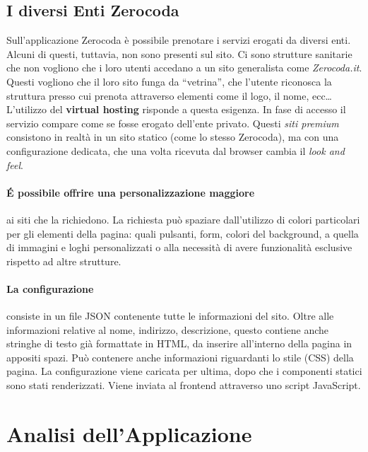 \subsection{I diversi Enti Zerocoda}
Sull'applicazione Zerocoda è possibile prenotare i servizi erogati da diversi enti. Alcuni di questi, tuttavia, non sono presenti sul sito. Ci sono strutture sanitarie che non vogliono che i loro utenti accedano a un sito generalista come \emph{Zerocoda.it}. Questi vogliono che il loro sito funga da ``vetrina'', che l'utente riconosca la struttura presso cui prenota attraverso elementi come il logo, il nome, ecc\dots L'utilizzo del \textbf{virtual hosting} risponde a questa esigenza. In fase di accesso il servizio compare come se fosse erogato dell’ente privato. Questi \textit{siti premium} consistono in realtà in un sito statico (come lo stesso Zerocoda), ma con una configurazione dedicata, che una volta ricevuta dal browser cambia il \emph{look and feel}.

\paragraph{É possibile offrire una  personalizzazione maggiore} ai siti che la richiedono. La richiesta può spaziare dall'utilizzo di colori particolari per gli elementi della pagina: quali pulsanti, form, colori del background, a quella di immagini e loghi personalizzati o alla necessità di avere funzionalità esclusive rispetto ad altre strutture.

\paragraph{La configurazione} consiste in un file JSON contenente tutte le informazioni del sito. Oltre alle informazioni relative al nome, indirizzo, descrizione, questo contiene anche stringhe di testo già formattate in HTML, da inserire all'interno della pagina in appositi spazi. Può contenere anche informazioni riguardanti lo stile (CSS) della pagina. La configurazione viene caricata per ultima, dopo che i componenti statici sono stati renderizzati. Viene inviata al frontend attraverso uno script JavaScript.

\section{Analisi dell'Applicazione}
